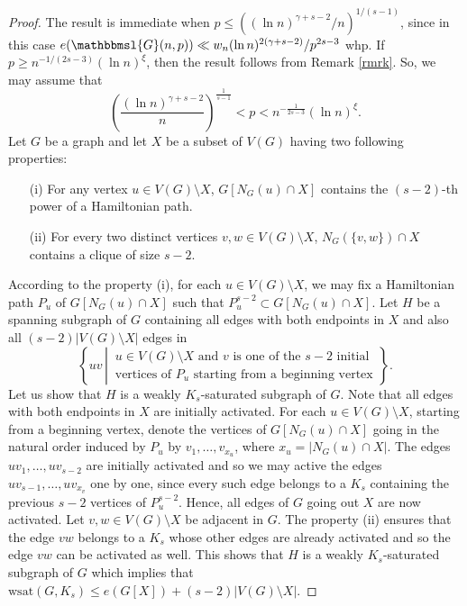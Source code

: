 \documentclass[hidelinks, 11pt]{article}
\theoremstyle{plain}
\theoremstyle{definition}
\begin{document}
\begin{proof}
The result is immediate when     $p\leq((\ln n)^{\gamma+s-2}/n)^{1/(s-1)}$,   since   in this case  $e(\mathbbmsl{G}(n,p))\ll w_n(\ln n)^{2(\gamma+s-2)}/p^{2s-3}$ whp. If  $p\geq n^{-1/(2s-3)}(\ln n)^\xi$, then   the result follows from Remark \ref{rmrk}. So,  we may assume that
$$\left(\frac{(\ln n)^{\gamma+s-2}}{n}\right)^{\frac{1}{s-1}}<p<n^{-\frac{1}{2s-3}}(\ln n)^\xi.$$
Let $G$ be a graph and let  $X$ be a subset of  $V(G)$ having  two following properties:
\begin{itemize}
\item [(i)] For  any   vertex $u\in V(G)\setminus X$,     $G[N_G(u)\cap X]$  contains the  $(s-2)$-th power of a Hamiltonian path.
\item [(ii)] For every  two distinct vertices $v,w\in V(G)\setminus X$, $N_G(\{v, w\})\cap X$  contains a clique of size $s-2$.
\end{itemize}
According to  the property (i), for each    $u\in V(G)\setminus X$, we may   fix a     Hamiltonian  path  $P_u$  of  $G[N_G(u)\cap X]$ such that $P_u^{s-2}\subset G[N_G(u)\cap X]$.
Let	$H$ be a spanning subgraph of $G$ containing all edges with both endpoints in $X$ and also  all $(s-2)|V(G)\setminus X|$   edges in
$$\left\{uv  \, \left| \,
\begin{array}{ll}
    \text{$u\in V(G)\setminus X$   and $v$    is one of  the    $s-2$ initial}\\
    \text{vertices of $P_u$ starting from  a beginning   vertex}
   \end{array}
    \right.\right\}.$$
Let us show that $H$ is  a weakly $K_s$-saturated subgraph of  $G$.
Note that all edges with both endpoints in $X$ are initially  activated.
For each $u\in V(G)\setminus X$,
starting from   a beginning   vertex,
denote the vertices of $G[N_G(u)\cap X]$  going in the natural order induced
by $P_u$ by
$v_1, \ldots, v_{x_u}$, where $x_u=|N_G(u)\cap X|$.  The edges  $uv_1,\ldots,uv_{s-2}$ are initially    activated and so
we may active  the edges $uv_{s-1},  \ldots, uv_{x_v}$ one by one,  since   every such edge belongs to a $K_s$  containing the previous $s-2$ vertices of $P_u^{s-2}$.
Hence,  all edges of $G$ going out   $X$   are now activated. Let $v,w\in V(G)\setminus X$ be adjacent in $G$. The property (ii) ensures that the edge  $vw$   belongs to a   $K_s$ whose  other
edges    are already
activated and so the edge $vw$ can be activated as well. This shows that  $H$ is  a weakly $K_s$-saturated subgraph of  $G$ which implies that
$\mathrm{wsat}(G, K_s)\leq e(G[X])+(s-2)|V(G)\setminus X|$.
	



\end{proof}
\end{document}
